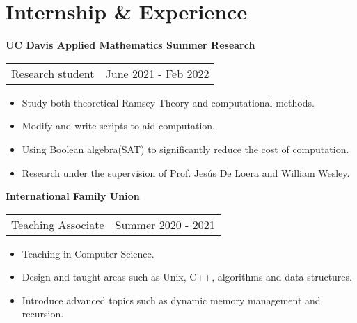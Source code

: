\section{\sc Internship \& Experience}
{\bf{UC Davis Applied Mathematics Summer Research}}\\
\begin{tabular}{@{}p{4in}p{2in}}
Research student & June 2021 - Feb 2022\\
\end{tabular}
\begin{itemize}
\setlength\itemsep{0em}
\item Study both theoretical Ramsey Theory and computational methods.
\item Modify and write scripts to aid computation.
\item Using Boolean algebra(SAT) to significantly reduce the cost of computation.
\item Research under the supervision of Prof. Jes\'{u}s De Loera and William Wesley. 
\end{itemize}

{\bf{International Family Union}}\\
\begin{tabular}{@{}p{4in}p{2in}}
Teaching Associate & Summer 2020 - 2021\\
\end{tabular}
\begin{itemize}
\setlength\itemsep{0em}
\item Teaching in Computer Science.
\item Design and taught areas such as Unix, C++, algorithms and data structures.
\item Introduce advanced topics such as dynamic memory management and recursion.
\end{itemize}

\endinput